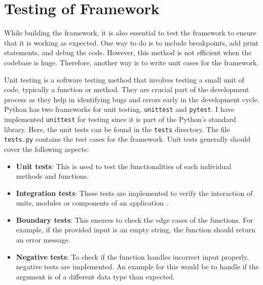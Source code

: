 \section{Testing of Framework}
While building the framework, it is also essential to test the framework to ensure that it is working as expected. One way to do is to include breakpoints, add print 
statements, and debug the code. However, this method is not efficient when the codebase is huge. Therefore, another way is to write unit cases for the framework.

Unit testing is a software testing method that involves testing a small unit of code, typically a function or method. They are crucial part of the development 
process as they help in identifying bugs and errors early in the development cycle. Python has two frameworks for unit testing, \texttt{unittest} and 
\texttt{pytest}. I have implemented \texttt{unittest} for testing since it is part of the Python's standard library. Here, the unit tests can be found 
in the \texttt{tests} directory. The file \texttt{tests.py} contains the test cases for the framework. Unit tests generally should cover the following aspects:
\begin{itemize}
  \item \textbf{Unit tests}:\newline
  This is used to test the functionalities of each individual methods and functions.
  \item \textbf{Integration tests}:\newline
  These tests are implemented to verify the interaction of units, modules or components of an application .
  \item \textbf{Boundary tests}:\newline
  This ensures to check the edge cases of the functions. For example, if the provided input is an empty string, the function should return an error message.
  \item \textbf{Negative tests}:\newline
  To check if the function handles incorrect input properly, negative tests are implemented. An example for this would be to handle if the argument is of a 
  different data type than expected. 
\end{itemize}

